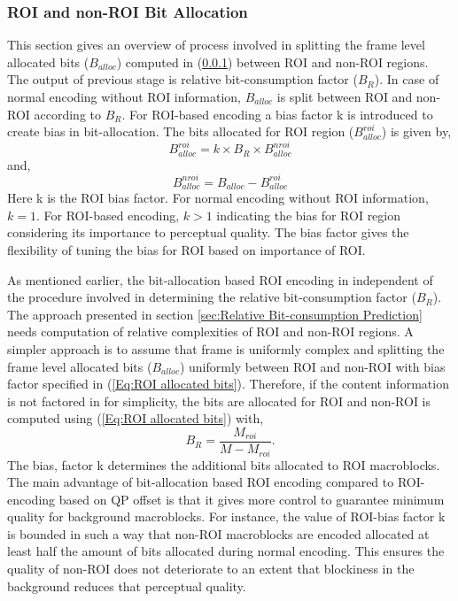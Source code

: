 \documentclass[11pt]{article} %
\begin{document}
\subsubsection{ROI and non-ROI Bit Allocation}
This section gives an overview of process involved in splitting the frame level allocated bits ($B_{alloc}$) computed in (\ref{}) between ROI and non-ROI regions. The output of previous stage is relative bit-consumption factor ($B_R$). In case of normal encoding without ROI information, $B_{alloc}$ is split between ROI and non-ROI according to $B_R$. For ROI-based encoding a bias factor k is introduced to create bias in bit-allocation. The bits allocated for ROI region ($B_{alloc}^{roi}$) is given by,
\begin{equation}
\label{Eq:ROI allocated bits}
B_{alloc}^{roi} = k \times B_R \times B_{alloc}^{nroi}
\end{equation}
and,
$$ B_{alloc}^{nroi} = B_{alloc} - B_{alloc}^{roi}$$
Here k is the ROI bias factor. For normal encoding without ROI information, $k = 1$. For ROI-based encoding, $k > 1$ indicating the bias for ROI region considering its importance to perceptual quality. The bias factor gives the flexibility of tuning the bias for ROI based on importance of ROI.

As mentioned earlier, the bit-allocation based ROI encoding in independent of the procedure involved in determining the relative bit-consumption factor ($B_R$). The approach presented in section \ref{sec:Relative Bit-consumption Prediction} needs computation of relative complexities of ROI and non-ROI regions. A simpler approach is to assume that frame is uniformly complex and splitting the frame level allocated bits ($B_{alloc}$) uniformly between ROI and non-ROI with bias factor specified in (\ref{Eq:ROI allocated bits}). Therefore, if the content information is not factored in for simplicity, the bits are allocated for ROI and non-ROI is computed using (\ref{Eq:ROI allocated bits}) with,
$$B_R = \frac{M_{roi}}{M - M_{roi}}.$$ 
The bias, factor k determines the additional bits allocated to ROI macroblocks. The main advantage of bit-allocation based ROI encoding compared to ROI-encoding based on QP offset is that it gives more control to guarantee minimum quality for background macroblocks. For instance, the value of ROI-bias factor k is bounded in such a way that non-ROI macroblocks are encoded allocated at least half the amount of bits allocated during normal encoding. This ensures the quality of non-ROI does not deteriorate to an extent that blockiness in the background reduces that perceptual quality.
\end{document}
